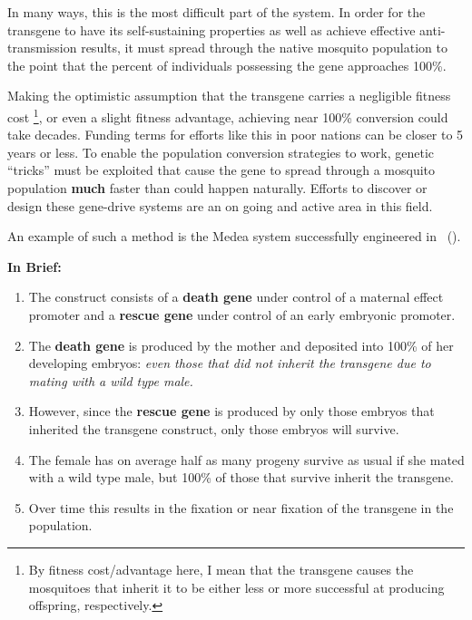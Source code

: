 In many ways, this is the most difficult part of the system.
In order for the transgene to have its self-sustaining properties as well as achieve effective anti-transmission results, it must spread through the native mosquito population to the point that the percent of individuals possessing the gene approaches 100\%.

Making the optimistic assumption that the transgene carries a negligible fitness cost
\footnote{By fitness cost/advantage here, I mean that the transgene
    causes the mosquitoes that inherit it to be either less or more
    successful at producing offspring, respectively.},
or even a slight fitness advantage, achieving near 100\% conversion could take decades.
Funding terms for efforts like this in poor nations can be closer to 5 years or less.
To enable the population conversion strategies to work, genetic ``tricks'' must be exploited that cause the gene to spread through a mosquito population \textbf{much} faster than could happen naturally.
Efforts to discover or design these \gls{gene-drive} systems are an on going and active area in this field.

An example of such a method is the Medea system successfully engineered in \Dm\ (\CITEME).

\textbf{In Brief:}
\begin{enumerate}
 \item The construct consists of a \textbf{death gene} under control of a maternal effect promoter and a \textbf{rescue gene} under control of an early embryonic promoter.
 \item The \textbf{death gene} is produced by the mother and deposited into 100\% of her developing embryos: \textit{even those that did not inherit the transgene due to mating with a wild type male.}
 \item However, since the \textbf{rescue gene} is produced by only those embryos that inherited the transgene construct, only those embryos will survive.
 \item The female has on average half as many progeny survive as usual if she mated with a wild type male, but 100\% of those that survive inherit the transgene.
 \item Over time this results in the fixation or near fixation of the transgene in the population.
\end{enumerate}


